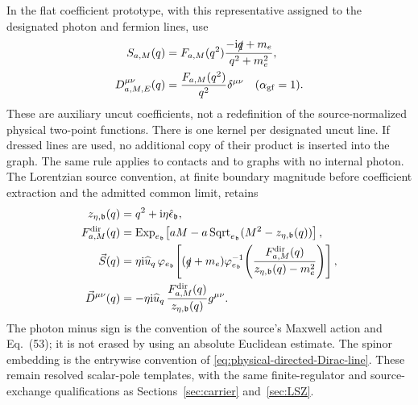 \documentclass[final,5p,times,twocolumn,numbers,nopreprintline]{elsarticle}
\numberwithin{equation}{section}
\theoremstyle{definition}
\theoremstyle{remark}
\newcommand{\ii}{\mathrm i}
\newcommand{\bb}{\mathfrak b}
\newcommand{\ee}{e_{\bb}}
\newcommand{\epsvec}{\hat\epsilon_{\bb}}
\newcommand{\embed}{\varphi_{\ee}}
\newcommand{\ExpDir}{\operatorname{Exp}_{\ee}}
\newcommand{\SqrtDir}{\operatorname{Sqrt}_{\ee}}
\begin{document}
In the flat coefficient prototype, with this representative assigned to
the designated photon and fermion lines, use
\begin{equation}
\begin{aligned}
 S_{a,M}(q)&=F_{a,M}(q^2)
                 \frac{-\ii\slashed q+m_e}{q^2+m_e^2},\\
 D_{a,M,E}^{\mu\nu}(q)&=
           \frac{F_{a,M}(q^2)}{q^2}\delta^{\mu\nu}
                 \quad(\alpha_{\rm gf}=1).
\end{aligned}
\label{eq:OQED-Euclidean-lines}
\end{equation}
These are auxiliary uncut coefficients, not a redefinition of the
source-normalized physical two-point functions. There is one kernel
per designated uncut line. If dressed lines are used, no additional
copy of their product is inserted into the graph. The same rule applies
to contacts and to graphs with no internal photon. The Lorentzian
source convention, at finite boundary magnitude before coefficient
extraction and the admitted common limit, retains
\begin{equation}
\begin{aligned}
 z_{\eta,\bb}(q)&=q^2+\ii\eta\epsvec,\\
 F^{\rm dir}_{a,M}(q)&=
    \ExpDir\!\left[aM-a\SqrtDir(M^2-z_{\eta,\bb}(q))\right],\\
 \vec S(q)&=\eta\ii\widehat u_q\,
    \embed\!\left[(\slashed q+m_e)
      \embed^{-1}\!\left(\frac{F^{\rm dir}_{a,M}(q)}
                               {z_{\eta,\bb}(q)-m_e^2}\right)\right],\\
 \vec D^{\mu\nu}(q)&=-\eta\ii\widehat u_q\,
       \frac{F^{\rm dir}_{a,M}(q)}{z_{\eta,\bb}(q)}g^{\mu\nu}.
\end{aligned}
\label{eq:OQED-directed-lines}
\end{equation}
The photon minus sign is the convention of the source's Maxwell action
and Eq.~(53); it is not erased by using an absolute Euclidean estimate.
The spinor embedding is the entrywise convention of
\eqref{eq:physical-directed-Dirac-line}. These remain resolved
scalar-pole templates, with the same finite-regulator and source-exchange
qualifications as Sections~\ref{sec:carrier} and~\ref{sec:LSZ}.
\end{document}
